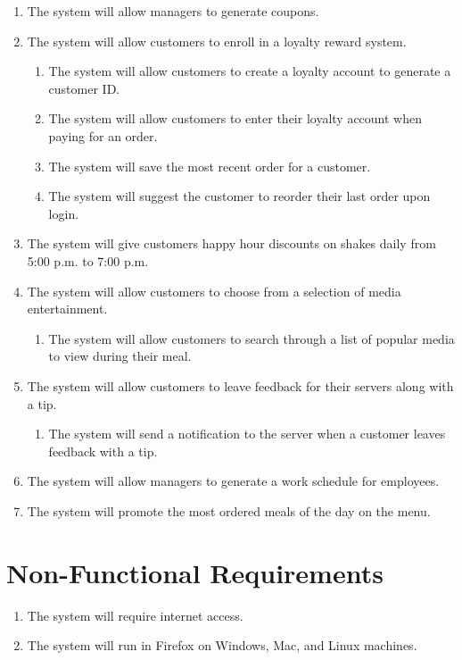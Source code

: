 \documentclass[12pt]{article}
\begin{document}
\begin{enumerate}
			\item The system will allow managers to generate coupons.

			\item The system will allow customers to enroll in a loyalty reward system.
				\begin{enumerate}
					\item The system will allow customers to create a loyalty account to generate a customer ID.
					\item The system will allow customers to enter their loyalty account when paying for an order.
					\item The system will save the most recent order for a customer.
					\item The system will suggest the customer to reorder their last order upon login.
				\end{enumerate}
				
			\item The system will give customers happy hour discounts on shakes daily from 5:00 p.m. to 7:00 p.m.

			\item The system will allow customers to choose from a selection of media entertainment.
				\begin{enumerate}
					\item The system will allow customers to search through a list of popular media to view during their meal.
				\end{enumerate}

			\item The system will allow customers to leave feedback for their servers along with a tip.
				\begin{enumerate}
					\item The system will send a notification to the server when a customer leaves feedback with a tip.
				\end{enumerate}

			\item The system will allow managers to generate a work schedule for employees.

			\item The system will promote the most ordered meals of the day on the menu.
		\end{enumerate}

	\section{Non-Functional Requirements}
		\begin{enumerate}
			\item The system will require internet access.
			\item The system will run in Firefox on Windows, Mac, and Linux machines.
		\end{enumerate}
\end{document}
